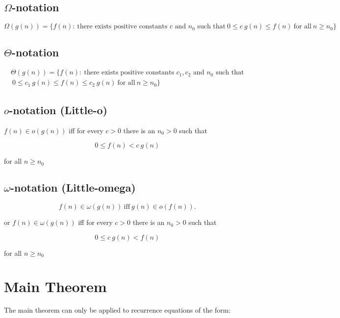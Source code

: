\documentclass{article}
\begin{document}
\subsection{$\Omega$-notation}
\begin{equation*}
\Omega(g(n)) = \{ f(n) : \ \text{there exists positive constants $c$ and $n_0$ such that} \ 0 \leq c \ g(n) \leq f(n) \ \text{for all} \ n \geq n_0 \}
\end{equation*}

\subsection{$\Theta$-notation}
\begin{align*}
\Theta(g(n)) = \{ f(n) : \ \text{there exists positive constants $c_1, c_2$ and $n_0$ such that} \\ \ 0 \leq c_1 \ g(n) \leq f(n) \leq c_2\ g(n) \ \text{for all} \ n \geq n_0 \}
\end{align*}

\subsection{$o$-notation (Little-o)}
$f(n) \in o(g(n)) $ iff for every $c > 0$ there is an $n_0 > 0$ such that

\begin{equation*}
0 \leq f(n) < c \ g(n)
\end{equation*}

for all $n \geq n_0$

\subsection{$\omega$-notation (Little-omega)}
\begin{equation*}
f(n) \in \omega(g(n)) \ \text{iff} \ g(n) \in o(f(n)).
\end{equation*}

or $f(n) \in \omega(g(n))$ iff for every $c > 0$ there is an $n_0 > 0$ such that

\begin{equation*}
0 \leq c \ g(n) < f(n)
\end{equation*}

for all $n \geq n_0$

\section{Main Theorem}
The main theorem can only be applied to recurrence equations of the form:
\end{document}
